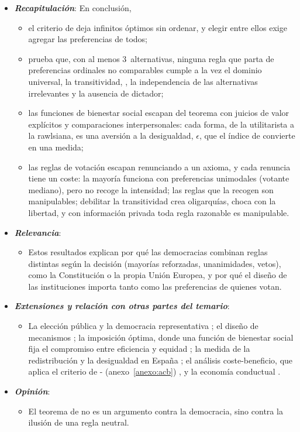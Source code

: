 \documentclass[11pt]{article}
\begin{document}
\begin{itemize}
\item \textbf{\emph{Recapitulación}}: En conclusión,
  \begin{itemize}
  \item el criterio de  deja infinitos óptimos sin ordenar, y elegir entre ellos exige agregar las preferencias de todos;
  \item \textcite{Arrow1951Social} prueba que, con al menos 3~alternativas, ninguna regla que parta de preferencias ordinales no comparables cumple a la vez el dominio universal, la transitividad, , la independencia de las alternativas irrelevantes y la ausencia de dictador;
  \item las funciones de bienestar social escapan del teorema con juicios de valor explícitos y comparaciones interpersonales: cada forma, de la utilitarista a la rawlsiana, es una aversión a la desigualdad, $\epsilon$, que el índice de  convierte en una medida;
  \item las reglas de votación escapan renunciando a un axioma, y cada renuncia tiene un coste: la mayoría funciona con preferencias unimodales (votante mediano), pero no recoge la intensidad; las reglas que la recogen son manipulables; debilitar la transitividad crea oligarquías,  choca con la libertad, y con información privada toda regla razonable es manipulable\nocite{Gibbard1973Manipulation,Satterthwaite1975Strategy}.
  \end{itemize}
\item \textbf{\emph{Relevancia}}:
  \begin{itemize}
  \item Estos resultados explican por qué las democracias combinan reglas distintas según la decisión (mayorías reforzadas, unanimidades, vetos), como la Constitución o la propia Unión Europea, y por qué el diseño de las instituciones importa tanto como las preferencias de quienes votan.
  \end{itemize}
\item \textbf{\emph{Extensiones y relación con otras partes del temario}}:
  \begin{itemize}
  \item La elección pública y la democracia representativa  ; el diseño de mecanismos ; la imposición óptima, donde una función de bienestar social fija el compromiso entre eficiencia y equidad ; la medida de la redistribución  y la desigualdad en España ; el análisis coste-beneficio, que aplica el criterio de - (anexo~\ref{anexo:acb})  , y la economía conductual .
  \end{itemize}
\item \textbf{\emph{Opinión}}:
  \begin{itemize}
  \item El teorema de  no es un argumento contra la democracia, sino contra la ilusión de una regla neutral.


\end{itemize}
\end{itemize}
\end{document}
